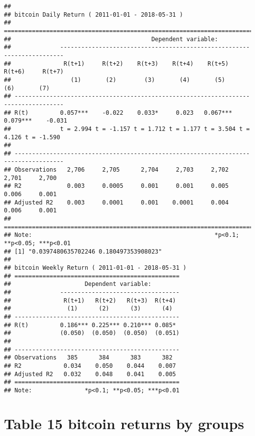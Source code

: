 \documentclass[
]{article}
\begin{document}
\begin{verbatim}
## 
## bitcoin Daily Return ( 2011-01-01 - 2018-05-31 )
## ====================================================================================
##                                        Dependent variable:                          
##              -----------------------------------------------------------------------
##               R(t+1)     R(t+2)    R(t+3)    R(t+4)    R(t+5)    R(t+6)     R(t+7)  
##                 (1)       (2)        (3)       (4)       (5)       (6)       (7)    
## ------------------------------------------------------------------------------------
## R(t)         0.057***    -0.022    0.033*     0.023   0.067***  0.079***    -0.031  
##              t = 2.994 t = -1.157 t = 1.712 t = 1.177 t = 3.504 t = 4.126 t = -1.590
##                                                                                     
## ------------------------------------------------------------------------------------
## Observations   2,706     2,705      2,704     2,703     2,702     2,701     2,700   
## R2             0.003     0.0005     0.001     0.001     0.005     0.006     0.001   
## Adjusted R2    0.003     0.0001     0.001    0.0001     0.004     0.006     0.001   
## ====================================================================================
## Note:                                                    *p<0.1; **p<0.05; ***p<0.01
## [1] "0.0397480635702246 0.180497353908023"
## 
## bitcoin Weekly Return ( 2011-01-01 - 2018-05-31 )
## ===============================================
##                     Dependent variable:        
##              ----------------------------------
##               R(t+1)   R(t+2)   R(t+3)  R(t+4) 
##                (1)      (2)      (3)      (4)  
## -----------------------------------------------
## R(t)         0.186*** 0.225*** 0.210*** 0.085* 
##              (0.050)  (0.050)  (0.050)  (0.051)
##                                                
## -----------------------------------------------
## Observations   385      384      383      382  
## R2            0.034    0.050    0.044    0.007 
## Adjusted R2   0.032    0.048    0.041    0.005 
## ===============================================
## Note:               *p<0.1; **p<0.05; ***p<0.01
\end{verbatim}

\hypertarget{table-15-bitcoin-returns-by-groups}{%
\section{Table 15 bitcoin returns by
groups}\label{table-15-bitcoin-returns-by-groups}}
\end{document}
